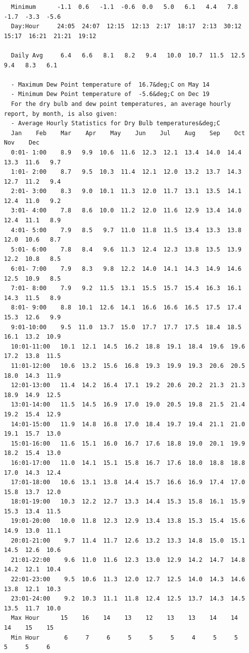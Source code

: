 \begin{lstlisting}
  Minimum      -1.1  0.6   -1.1  -0.6  0.0   5.0   6.1   4.4   7.8   -1.7  -3.3  -5.6  
  Day:Hour     24:05  24:07  12:15  12:13  2:17  18:17  2:13  30:12  15:17  16:21  21:21  19:12 

  Daily Avg     6.4   6.6   8.1   8.2   9.4   10.0  10.7  11.5  12.5  9.4   8.3   6.1   

  - Maximum Dew Point temperature of  16.7&deg;C on May 14
  - Minimum Dew Point temperature of  -5.6&deg;C on Dec 19
  For the dry bulb and dew point temperatures, an average hourly report, by month, is also given:
  - Average Hourly Statistics for Dry Bulb temperatures&deg;C
  Jan    Feb    Mar    Apr    May    Jun    Jul    Aug    Sep    Oct    Nov    Dec   
  0:01- 1:00    8.9   9.9  10.6  11.6  12.3  12.1  13.4  14.0  14.4  13.3  11.6   9.7 
  1:01- 2:00    8.7   9.5  10.3  11.4  12.1  12.0  13.2  13.7  14.3  12.7  11.2   9.4 
  2:01- 3:00    8.3   9.0  10.1  11.3  12.0  11.7  13.1  13.5  14.1  12.4  11.0   9.2 
  3:01- 4:00    7.8   8.6  10.0  11.2  12.0  11.6  12.9  13.4  14.0  12.4  11.1   8.9 
  4:01- 5:00    7.9   8.5   9.7  11.0  11.8  11.5  13.4  13.3  13.8  12.0  10.6   8.7 
  5:01- 6:00    7.8   8.4   9.6  11.3  12.4  12.3  13.8  13.5  13.9  12.2  10.8   8.5 
  6:01- 7:00    7.9   8.3   9.8  12.2  14.0  14.1  14.3  14.9  14.6  12.5  10.9   8.5 
  7:01- 8:00    7.9   9.2  11.5  13.1  15.5  15.7  15.4  16.3  16.1  14.3  11.5   8.9 
  8:01- 9:00    8.8  10.1  12.6  14.1  16.6  16.6  16.5  17.5  17.4  15.3  12.6   9.9 
  9:01-10:00    9.5  11.0  13.7  15.0  17.7  17.7  17.5  18.4  18.5  16.1  13.2  10.9 
  10:01-11:00   10.1  12.1  14.5  16.2  18.8  19.1  18.4  19.6  19.6  17.2  13.8  11.5 
  11:01-12:00   10.6  13.2  15.6  16.8  19.3  19.9  19.3  20.6  20.5  18.0  14.3  11.9 
  12:01-13:00   11.4  14.2  16.4  17.1  19.2  20.6  20.2  21.3  21.3  18.9  14.9  12.5 
  13:01-14:00   11.5  14.5  16.9  17.0  19.0  20.5  19.8  21.5  21.4  19.2  15.4  12.9 
  14:01-15:00   11.9  14.8  16.8  17.0  18.4  19.7  19.4  21.1  21.0  19.1  15.7  13.0 
  15:01-16:00   11.6  15.1  16.0  16.7  17.6  18.8  19.0  20.1  19.9  18.2  15.4  13.0 
  16:01-17:00   11.0  14.1  15.1  15.8  16.7  17.6  18.0  18.8  18.8  17.0  14.3  12.4 
  17:01-18:00   10.6  13.1  13.8  14.4  15.7  16.6  16.9  17.4  17.0  15.8  13.7  12.0 
  18:01-19:00   10.3  12.2  12.7  13.3  14.4  15.3  15.8  16.1  15.9  15.3  13.4  11.5 
  19:01-20:00   10.0  11.8  12.3  12.9  13.4  13.8  15.3  15.4  15.6  14.9  13.0  11.1 
  20:01-21:00    9.7  11.4  11.7  12.6  13.2  13.3  14.8  15.0  15.1  14.5  12.6  10.6 
  21:01-22:00    9.6  11.0  11.6  12.3  13.0  12.9  14.2  14.7  14.8  14.2  12.1  10.4 
  22:01-23:00    9.5  10.6  11.3  12.0  12.7  12.5  14.0  14.3  14.6  13.8  12.1  10.3 
  23:01-24:00    9.2  10.3  11.1  11.8  12.4  12.5  13.7  14.3  14.5  13.5  11.7  10.0 
  Max Hour      15    16    14    13    12    13    13    14    14    14    15    15  
  Min Hour       6     7     6     5     5     5     4     5     5     5     5     6  


\end{lstlisting}
